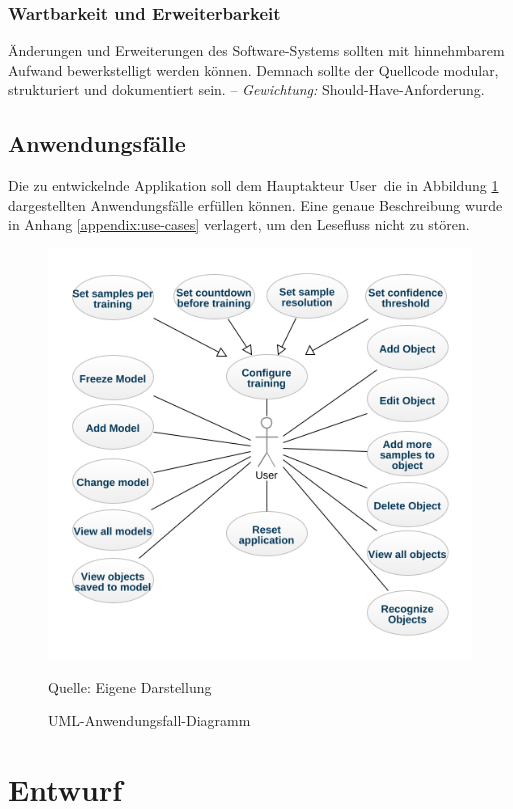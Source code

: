 \documentclass[oneside]{ausarbeitung}
\begin{document}
\subsection{Wartbarkeit und Erweiterbarkeit}
Änderungen und Erweiterungen des Software-Systems sollten mit hinnehmbarem Aufwand bewerkstelligt werden können. Demnach sollte der Quellcode modular, strukturiert und dokumentiert sein. -- \textit{Gewichtung:} Should-Have-Anforderung.

\section{Anwendungsfälle}
Die zu entwickelnde Applikation soll dem Hauptakteur \glqq User\grqq\ die in Abbildung \ref{fig:usecase-diagram} dargestellten Anwendungsfälle erfüllen können. Eine genaue Beschreibung wurde in Anhang \ref{appendix:use-cases} verlagert, um den Lesefluss nicht zu stören. 
\begin{figure}[hptb]
	\centering
	\includegraphics[height=0.6\textheight]{images/usecase-diagram.png}
	\caption{UML-Anwendungsfall-Diagramm} Quelle: Eigene Darstellung
	\label{fig:usecase-diagram}
\end{figure}
\chapter{Entwurf}
\end{document}
